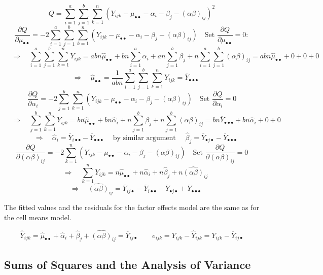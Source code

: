 \documentclass[
]{book}
\begin{document}
\[
Q=\sum_{i=1}^a\sum_{j=1}^b\sum_{k=1}^n
\left(Y_{ijk}-\mu_{\bullet\bullet}-\alpha_i-\beta_j-(\alpha\beta)_{ij}\right)^2
\] \[
\frac{\partial Q}{\partial \mu_{\bullet\bullet}}=-2
\sum_{i=1}^a\sum_{j=1}^b\sum_{k=1}^n
\left(Y_{ijk}-\mu_{\bullet\bullet}-\alpha_i-\beta_j-(\alpha\beta)_{ij}\right)
\quad \mbox{Set } \frac{\partial Q}{\partial \mu_{\bullet\bullet}}=0:
\] \[
\quad \Rightarrow \quad \sum_{i=1}^a\sum_{j=1}^b\sum_{k=1}^n Y_{ijk} = 
abn\hat{\mu}_{\bullet\bullet}+bn\sum_{i=1}^a\alpha_i+an\sum_{j=1}^b\beta_j+
n\sum_{i=1}^a\sum_{j=1}^b(\alpha\beta)_{ij}=abn\hat{\mu}_{\bullet\bullet}+0+0+0
\] \[
\quad \Rightarrow \quad \hat{\mu}_{\bullet\bullet} = \frac{1}{abn}
\sum_{i=1}^a\sum_{j=1}^b\sum_{k=1}^n Y_{ijk}=
\overline{Y}_{\bullet\bullet\bullet}
\] \[
\frac{\partial Q}{\partial \alpha_i}=-2\sum_{j=1}^b\sum_{k=1}^n
\left(Y_{ijk}-\mu_{\bullet\bullet}-\alpha_i-\beta_j-(\alpha\beta)_{ij}\right)
\quad \mbox{Set } \frac{\partial Q}{\partial \alpha_i}=0
\] \[
\quad \Rightarrow \quad \sum_{j=1}^b\sum_{k=1}^n Y_{ijk} =
bn\hat{\mu}_{\bullet\bullet} + bn\hat{\alpha}_i + n\sum_{j=1}^b\beta_j+
n\sum_{j=1}^b(\alpha\beta)_{ij}=
bn\overline{Y}_{\bullet\bullet\bullet}+bn\hat{\alpha}_i+0+0
\] \[
\quad \Rightarrow \quad \hat{\alpha}_i = 
\overline{Y}_{i\bullet\bullet}-\overline{Y}_{\bullet\bullet\bullet}
\quad \mbox { by similar argument } \quad 
\hat{\beta}_j = 
\overline{Y}_{\bullet j\bullet}-\overline{Y}_{\bullet\bullet\bullet}
\] \[
\frac{\partial Q}{\partial (\alpha\beta)_{ij}}=-2\sum_{k=1}^n
\left(Y_{ijk}-\mu_{\bullet\bullet}-\alpha_i-\beta_j-(\alpha\beta)_{ij}\right)
\quad \mbox{Set } \frac{\partial Q}{\partial (\alpha\beta)_{ij}}=0
\] \[
\quad \Rightarrow \quad \sum_{k=1}^n Y_{ijk} =
n\hat{\mu}_{\bullet\bullet} + n\hat{\alpha}_i + n\hat{\beta}_j+
n\hat{(\alpha\beta)}_{ij}
\] \[
\quad\Rightarrow\quad \hat{\left(\alpha\beta\right)}_{ij}=
\overline{Y}_{ij\bullet} - \overline{Y}_{i\bullet\bullet}
-\overline{Y}_{\bullet j \bullet} + \overline{Y}_{\bullet\bullet\bullet}
\]

The fitted values and the residuals for the factor effects model are the
same as for the cell means model.

\[
\hat{Y}_{ijk}=\hat{\mu}_{\bullet\bullet} + \hat{\alpha}_i
+\hat{\beta}_j+\hat{\left(\alpha\beta\right)}_{ij}=
\overline{Y}_{ij\bullet}
\qquad 
e_{ijk}=Y_{ijk}-\hat{Y}_{ijk}=Y_{ijk}-\overline{Y}_{ij\bullet}
\]

\subsection{Sums of Squares and the Analysis of
Variance}\label{sums-of-squares-and-the-analysis-of-variance}
\end{document}
